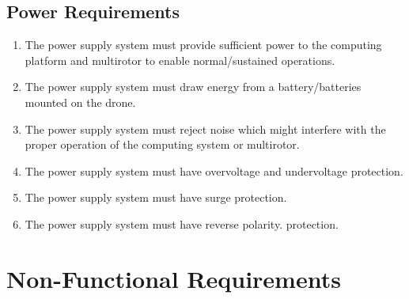 \documentclass[10pt,letterpaper]{article}
\begin{document}
\subsection{Power Requirements}
\begin{enumerate}[label=F.PR.\arabic*, wide=1cm, widest=3cm, leftmargin=*, font=\bfseries, noitemsep,topsep=0pt, parsep=4pt, partopsep=0pt]
	\item The power supply system must provide sufficient power to the computing platform and multirotor to enable normal/sustained operations.
	\item The power supply system must draw energy from a battery/batteries mounted on the drone.
    \item The power supply system must reject noise which might interfere with the proper operation of the computing system or multirotor.
    \item The power supply system must have overvoltage and undervoltage protection.
    \item The power supply system must have surge protection.
    \item The power supply system must have reverse polarity. protection.
\end{enumerate}


\section{Non-Functional Requirements}\label{section:nonfuncrec}
\end{document}
